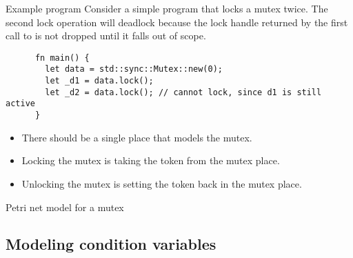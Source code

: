 \documentclass{beamer}
\begin{document}
\begin{frame}[fragile]{Example program}
  Consider a simple program that locks a mutex twice.
  The second lock operation will deadlock
  because the lock handle returned by the first call to 
  is not dropped until it falls out of scope.

  \vfill

  \begin{listing}
    \begin{verbatim}
      fn main() {
        let data = std::sync::Mutex::new(0);
        let _d1 = data.lock();
        let _d2 = data.lock(); // cannot lock, since d1 is still active
      }
    \end{verbatim}
  \end{listing}

  \vfill
  
  \begin{itemize}
    \item There should be a single place that models the mutex.
    \item Locking the mutex is taking the token from the mutex place.
    \item Unlocking the mutex is setting the token back in the mutex place.
  \end{itemize}
\end{frame}

\begin{frame}{Petri net model for a mutex}
  \begin{figure}
    \centering
    
  \end{figure}
\end{frame}

\subsection{Modeling condition variables}
\end{document}
